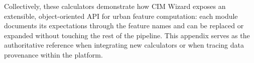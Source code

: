 Collectively, these calculators demonstrate how CIM Wizard exposes an
extensible, object-oriented API for urban feature computation: each
module documents its expectations through the feature names and can be
replaced or expanded without touching the rest of the pipeline. This
appendix serves as the authoritative reference when integrating new
calculators or when tracing data provenance within the platform.


